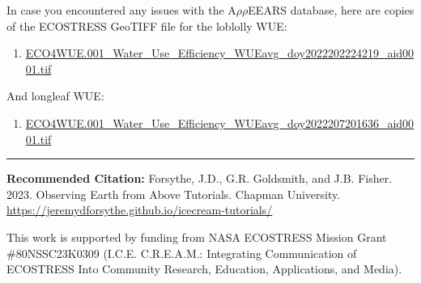 \documentclass[oneside,a4paper,11pt,explicit]{book}
\begin{document}
\begin{tcolorbox}[colback=yellow!5!white,title=\textbf{Datafiles}]
	\large
	In case you encountered any issues with the A$\rho\rho$EEARS database, here are copies of the ECOSTRESS GeoTIFF file for the loblolly WUE:
	\begin{enumerate}
		\item \href{https://jeremydforsythe.github.io/icecream-tutorials/Tutorial10_Evapotranspiration2/ECO4WUE.001_Water_Use_Efficiency_WUEavg_doy2022202224219_aid0001.tif}{\small ECO4WUE.001\_Water\_Use\_Efficiency\_WUEavg\_doy2022202224219\_aid0001.tif}
	\end{enumerate}
	And longleaf WUE:
	\begin{enumerate}
		\item \href{https://jeremydforsythe.github.io/icecream-tutorials/Tutorial10_Evapotranspiration2/ECO4WUE.001_Water_Use_Efficiency_WUEavg_doy2022207201636_aid0001.tif}{\small ECO4WUE.001\_Water\_Use\_Efficiency\_WUEavg\_doy2022207201636\_aid0001.tif}
	\end{enumerate}
\end{tcolorbox}


\hrule

\vspace{1em}

\small \textbf{Recommended Citation:} Forsythe, J.D., G.R. Goldsmith, and J.B. Fisher. 2023. Observing Earth from Above Tutorials. Chapman University. \url{https://jeremydforsythe.github.io/icecream-tutorials/}

\vspace{1em}

This work is supported by funding from NASA ECOSTRESS Mission Grant \#80NSSC23K0309 (I.C.E. C.R.E.A.M.: Integrating Communication of ECOSTRESS Into Community Research, Education, Applications, and Media).
\end{document}
